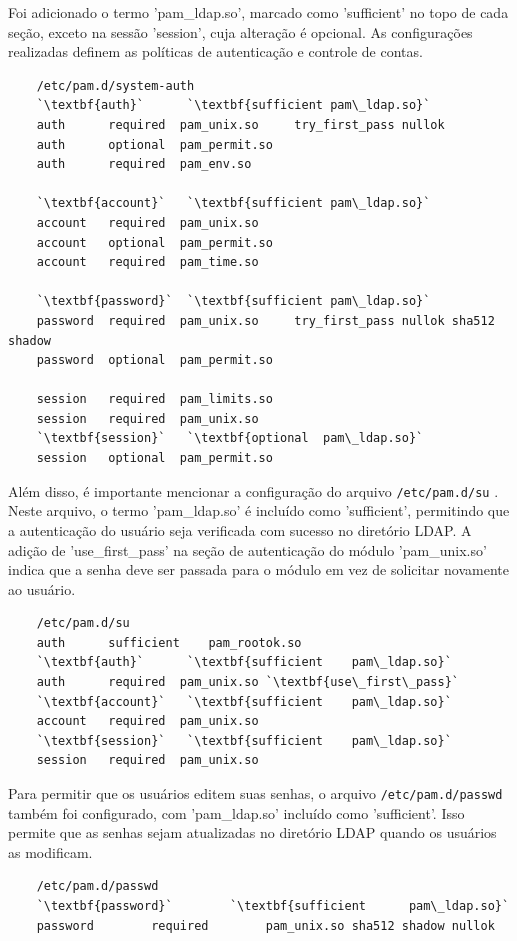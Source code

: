 Foi adicionado o termo 'pam\_ldap.so', marcado como 'sufficient' no topo de cada seção, exceto na sessão 'session', cuja alteração é opcional. As configurações realizadas definem as políticas de autenticação e controle de contas.

\begin{lstlisting}
    /etc/pam.d/system-auth
    `\textbf{auth}`      `\textbf{sufficient pam\_ldap.so}`
    auth      required  pam_unix.so     try_first_pass nullok
    auth      optional  pam_permit.so
    auth      required  pam_env.so
    
    `\textbf{account}`   `\textbf{sufficient pam\_ldap.so}`
    account   required  pam_unix.so
    account   optional  pam_permit.so
    account   required  pam_time.so
    
    `\textbf{password}`  `\textbf{sufficient pam\_ldap.so}`
    password  required  pam_unix.so     try_first_pass nullok sha512 shadow
    password  optional  pam_permit.so
    
    session   required  pam_limits.so
    session   required  pam_unix.so
    `\textbf{session}`   `\textbf{optional  pam\_ldap.so}`
    session   optional  pam_permit.so
\end{lstlisting}

Além disso, é importante mencionar a configuração do arquivo \verb|/etc/pam.d/su| . Neste arquivo, o termo 'pam\_ldap.so' é incluído como 'sufficient', permitindo que a autenticação do usuário seja verificada com sucesso no diretório LDAP. A adição de 'use\_first\_pass' na seção de autenticação do módulo 'pam\_unix.so' indica que a senha deve ser passada para o módulo em vez de solicitar novamente ao usuário.

\begin{lstlisting}
    /etc/pam.d/su
    auth      sufficient    pam_rootok.so
    `\textbf{auth}`      `\textbf{sufficient    pam\_ldap.so}`
    auth      required	pam_unix.so `\textbf{use\_first\_pass}`
    `\textbf{account}`   `\textbf{sufficient    pam\_ldap.so}`
    account   required	pam_unix.so
    `\textbf{session}`   `\textbf{sufficient    pam\_ldap.so}`
    session   required	pam_unix.so
\end{lstlisting}

Para permitir que os usuários editem suas senhas, o arquivo \verb|/etc/pam.d/passwd| também foi configurado, com 'pam\_ldap.so' incluído como 'sufficient'. Isso permite que as senhas sejam atualizadas no diretório LDAP quando os usuários as modificam.

\begin{lstlisting}
    /etc/pam.d/passwd
    `\textbf{password}`        `\textbf{sufficient      pam\_ldap.so}`
    password        required        pam_unix.so sha512 shadow nullok
\end{lstlisting}

